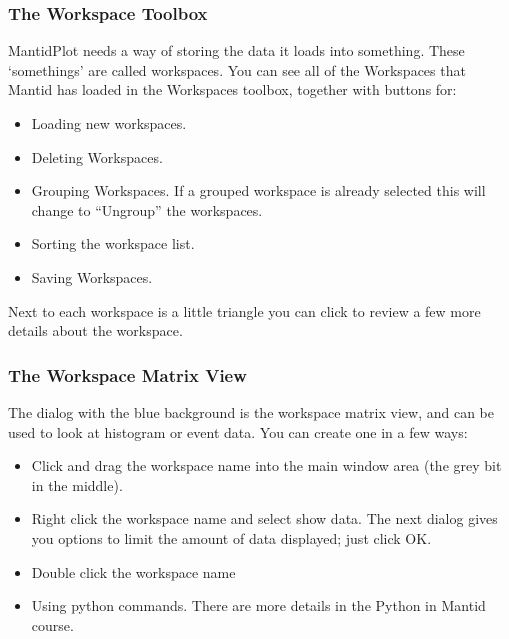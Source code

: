 \documentclass[letterpaper,10pt,english,openany]{sphinxmanual}
\begin{document}
\subsubsection{The Workspace Toolbox}
\label{\detokenize{mantid_basic_course/loading_and_displaying_data/02_the_matrix_workspace:the-workspace-toolbox}}
MantidPlot needs a way of storing the data it loads into something.
These ‘somethings’ are called workspaces. You can see all of the
Workspaces that Mantid has loaded in the Workspaces toolbox, together
with buttons for:
\begin{itemize}
\item {} 
Loading new workspaces.

\item {} 
Deleting Workspaces.

\item {} 
Grouping Workspaces. If a grouped workspace is already selected this
will change to “Ungroup” the workspaces.

\item {} 
Sorting the workspace list.

\item {} 
Saving Workspaces.

\end{itemize}

Next to each workspace is a little triangle you can click to review a
few more details about the workspace.


\subsubsection{The Workspace Matrix View}
\label{\detokenize{mantid_basic_course/loading_and_displaying_data/02_the_matrix_workspace:the-workspace-matrix-view}}
The dialog with the blue background is the workspace matrix view, and
can be used to look at histogram or event data. You can create one in a
few ways:
\begin{itemize}
\item {} 
Click and drag the workspace name into the main window area (the grey
bit in the middle).

\item {} 
Right click the workspace name and select show data. The next dialog
gives you options to limit the amount of data displayed; just click
OK.

\item {} 
Double click the workspace name

\item {} 
Using python commands. There are more details in the Python in Mantid
course.

\end{itemize}
\end{document}
